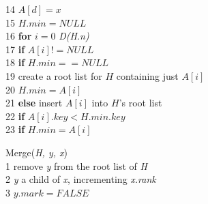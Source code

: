\documentclass[12pt, a4paper]{article}
\begin{document}
	14\-\hspace{0.5cm} \-\hspace{0.5cm} $A[d] = x$ \\
	15\-\hspace{0.5cm} $H.min = NULL$\\
	16\-\hspace{0.5cm} \textbf{for} $i = 0$ \textit{D(H.n)} \\
	17\-\hspace{0.5cm} \-\hspace{0.5cm} \textbf{if} $A[i] != NULL$\\
	18\-\hspace{0.5cm} \-\hspace{0.5cm} \-\hspace{0.5cm}  \textbf{if} $H.min == NULL$\\
	19\-\hspace{0.5cm} \-\hspace{0.5cm} \-\hspace{0.5cm} \-\hspace{0.5cm} create a root list for $H$ containing just $A[i]$ \\
	20\-\hspace{0.5cm} \-\hspace{0.5cm} \-\hspace{0.5cm} \-\hspace{0.5cm} $H.min = A[i]$ \\
	21\-\hspace{0.5cm} \-\hspace{0.5cm} \-\hspace{0.5cm} \textbf{else} insert $A[i]$ into $H$'s root list\\
	22\-\hspace{0.5cm} \-\hspace{0.5cm} \-\hspace{0.5cm} \-\hspace{0.5cm} \textbf{if} $A[i].key < H.min.key$\\
	23\-\hspace{0.5cm} \-\hspace{0.5cm} \-\hspace{0.5cm} \-\hspace{0.5cm} \-\hspace{0.5cm} \textbf{if} $H.min = A[i]$\\
	\newline
	
	\large{Merge(\textit{H, y, x})} \\
	1\-\hspace{0.5cm} remove \textit{y} from the root list of \textit{H} \\
	2\-\hspace{0.5cm} \textit{y} a child of \textit{x}, incrementing \textit{x.rank} \\
	3\-\hspace{0.5cm} $y.mark = FALSE$\\
	\newline
	
\end{document}
